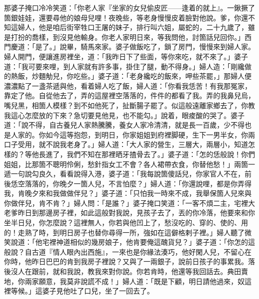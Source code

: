 那婆子掩口冷冷笑道：「你老人家『坐家的女兒偷皮匠——逢着的就上』。一鍬撅了箇銀娃娃，還要尋他的娘母兒哩！夜晚些，等老身慢慢皮着臉對他說。爹，你還不知這婦人，他是咱后街宰牲口王屠的妹子，排行叫六姐，屬蛇的，二十九歲了，雖是打扮的喬樣，到沒見他輸身。{}你老人家明日來，等我問他，討箇話兒回你。」西門慶道：「是了。」說畢，騎馬來家。婆子做飯吃了，鎖了房門，慢慢來到婦人家。婦人開門，便讓進房裡坐，道：「我昨日下了些面，等你來吃，就不來了。」婆子道：「我可要來哩，到人家就有許多事，掛住了腿，動不得身。」婦人造：「剛纔做的熱飯，炒麵觔兒，你吃些。」{}婆子道：「老身纔吃的飯來，呷些茶罷，」那婦人便濃濃點了一盞茶遞與他，看着婦人吃了飯，婦人道：「你看我恁苦！有我那冤家，靠定了他。自從他去了，弄的這屋裡空落落的，件件的都看了我。弄的我鼻兒烏，嘴兒黑，相箇人模樣？到不如他死了，扯斷腸子罷了。似這般遠離家鄉去了，你教我這心怎麼放的下來？急切要見他見，也不能勾。」{}說着，眼痠酸的哭了。婆子道：「說不得，自古養兒人家熱騰騰，養女人家冷清清，就是長一百歲，少不得也是人家的。你如今這等抱怨，到明日，你家姐姐到府裡脚硬，生下一男半女，你兩口子受用，就不說我老身了。」婦人道：「大人家的營生，三層大，兩層小，知道怎樣的？等他長進了，我們不知在那裡晒牙揸骨去了。」{}婆子道：「怎的恁般說！你們姐姐，比那箇不聰明伶俐，愁針指女工不會？各人裙帶衣食，你替他愁！」兩箇一遞一句說勾良久，看看說得入港，婆子道：「我每說箇傻話兒，你家官人不在，前後恁空落落的，你晚夕一箇人兒，不言怕麼？」婦人道：「你還說哩，都是你弄得我，肯晚夕來和我做做伴兒？」婆子道：「只怕我一時來不成，我舉保箇人兒來與你做伴兒，肯不肯？」婦人問：「是誰？」婆子掩口笑道：「一客不煩二主，宅裡大老爹昨日到那邊房子裡，如此這般對我說，見孩子去了，丟的你冷落，他要來和你坐半日兒，你怎麼說？這裡無人，你若與他凹上了，愁沒吃的、穿的、使的、用的！走熟了時，到明日房子也替你尋得一所，強如在這僻格剌子裡。」婦人聽了微笑說道：「他宅裡神道相似的幾房娘子，他肯要俺這醜貨兒？」{}婆子道：「你怎的這般說？自古道『情人眼內出西施』，一來也是你緣法湊巧，他好閑人兒，不留心在你時，他昨日巴巴的肯到我房子裡說？又與了一兩銀子，說前日孩子的事累我。落後沒人在跟前，就和我說，教我來對你說。你若肯時，他還等我回話去。典田賣地，你兩家願意，我莫非說謊不成！」婦人道：「既是下顧，明日請他過來，奴這裡等候。」這婆子見他吐了口兒，坐了一回去了。

